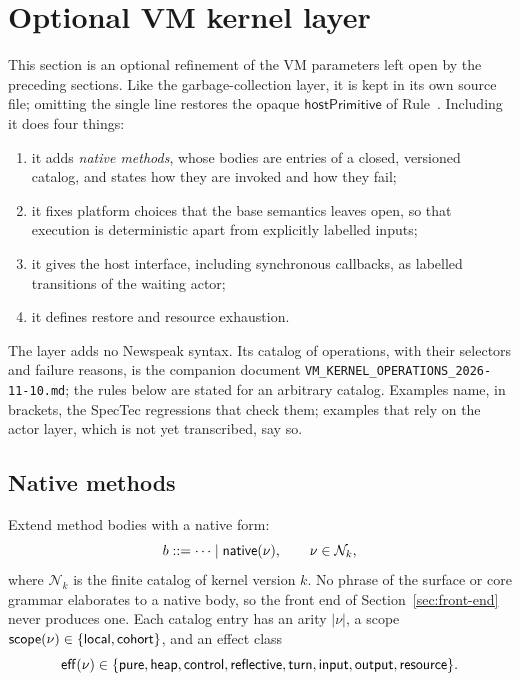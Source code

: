 \section{Optional VM kernel layer}
\label{sec:vm-kernel}

This section is an optional refinement of the VM parameters left open by the
preceding sections.  Like the garbage-collection layer, it is kept in its own
source file; omitting the single \verb|| line restores
the opaque $\mathsf{hostPrimitive}$ of Rule~.  Including
it does four things:
\begin{enumerate}
\item it adds \emph{native methods}, whose bodies are entries of a closed,
      versioned catalog, and states how they are invoked and how they fail;
\item it fixes platform choices that the base semantics leaves open, so that
      execution is deterministic apart from explicitly labelled inputs;
\item it gives the host interface, including synchronous callbacks, as
      labelled transitions of the waiting actor;
\item it defines restore and resource exhaustion.
\end{enumerate}
The layer adds no Newspeak syntax.  Its catalog of operations, with their
selectors and failure reasons, is the companion document
\texttt{VM\_KERNEL\_OPERATIONS\_2026-11-10.md}; the rules below are stated for
an arbitrary catalog.  Examples name, in brackets, the SpecTec regressions
that check them; examples that rely on the actor layer, which is not yet
transcribed, say so.

\subsection{Native methods}

Extend method bodies with a native form:
\begin{equation}\label{eq:native-body}
 b::=\cdots\mid\mathsf{native}(\nu),
 \qquad \nu\in\mathcal N_k,
\end{equation}
where $\mathcal N_k$ is the finite catalog of kernel version $k$.  No phrase of
the surface or core grammar elaborates to a native body, so the front end of
Section~\ref{sec:front-end} never produces one.  Each catalog entry has an
arity $|\nu|$, a scope $\mathsf{scope}(\nu)\in\{\mathsf{local},\mathsf{cohort}\}$,
and an effect class
\[\mathsf{eff}(\nu)\in\{\mathsf{pure},\mathsf{heap},\mathsf{control},\mathsf{reflective},
\mathsf{turn},\mathsf{input},\mathsf{output},\mathsf{resource}\}.\]

